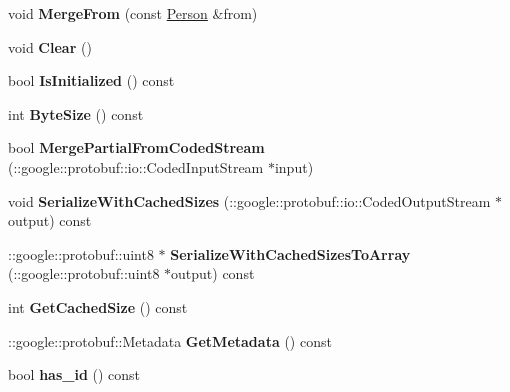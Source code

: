 \begin{DoxyCompactItemize}
\item 
\hypertarget{class_person_a6e77d31b1d19f959fec421c69d0f8951}{}void {\bfseries Merge\+From} (const \hyperlink{class_person}{Person} \&from)\label{class_person_a6e77d31b1d19f959fec421c69d0f8951}

\item 
\hypertarget{class_person_ae8587b1a13d7372a74939b840198f16a}{}void {\bfseries Clear} ()\label{class_person_ae8587b1a13d7372a74939b840198f16a}

\item 
\hypertarget{class_person_a6f41007b4a34d035af290c257658c567}{}bool {\bfseries Is\+Initialized} () const \label{class_person_a6f41007b4a34d035af290c257658c567}

\item 
\hypertarget{class_person_ad6e3b20690c0cfe7ae88f7ad1884b9a4}{}int {\bfseries Byte\+Size} () const \label{class_person_ad6e3b20690c0cfe7ae88f7ad1884b9a4}

\item 
\hypertarget{class_person_aca3e4caf4fe39aa2ed1ac5609bf3dcbe}{}bool {\bfseries Merge\+Partial\+From\+Coded\+Stream} (\+::google\+::protobuf\+::io\+::\+Coded\+Input\+Stream $\ast$input)\label{class_person_aca3e4caf4fe39aa2ed1ac5609bf3dcbe}

\item 
\hypertarget{class_person_a13b73bfb0fe34a8049bd98e53a4234b7}{}void {\bfseries Serialize\+With\+Cached\+Sizes} (\+::google\+::protobuf\+::io\+::\+Coded\+Output\+Stream $\ast$output) const \label{class_person_a13b73bfb0fe34a8049bd98e53a4234b7}

\item 
\hypertarget{class_person_a95200e4395c2d19c0ea9411eafcbe689}{}\+::google\+::protobuf\+::uint8 $\ast$ {\bfseries Serialize\+With\+Cached\+Sizes\+To\+Array} (\+::google\+::protobuf\+::uint8 $\ast$output) const \label{class_person_a95200e4395c2d19c0ea9411eafcbe689}

\item 
\hypertarget{class_person_a9f31b1aa67c7a97ba464765321fdec80}{}int {\bfseries Get\+Cached\+Size} () const \label{class_person_a9f31b1aa67c7a97ba464765321fdec80}

\item 
\hypertarget{class_person_ac84a1f3df68fa8156ed690be6248a897}{}\+::google\+::protobuf\+::\+Metadata {\bfseries Get\+Metadata} () const \label{class_person_ac84a1f3df68fa8156ed690be6248a897}

\item 
\hypertarget{class_person_ae146827e973466d308601cd1766b6e5a}{}bool {\bfseries has\+\_\+id} () const \label{class_person_ae146827e973466d308601cd1766b6e5a}


\end{DoxyCompactItemize}
